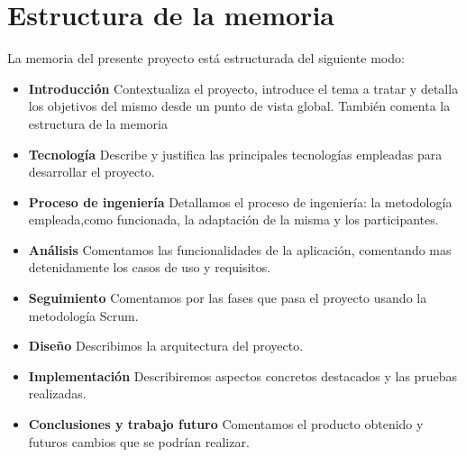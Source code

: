 \section{Estructura de la memoria}
La memoria del presente proyecto está estructurada del siguiente modo:

\begin{itemize}
\item \textbf{Introducción} Contextualiza el proyecto, introduce el tema a tratar y detalla los objetivos del mismo desde un punto de vista global.
 También comenta la estructura de la memoria 

\item \textbf{Tecnología} Describe y justifica las principales tecnologías empleadas para desarrollar el proyecto.



\item \textbf{Proceso de ingeniería} Detallamos el proceso de ingeniería: la metodología empleada,como funcionada, la adaptación de la misma y los participantes.


\item \textbf{Análisis} Comentamos las funcionalidades de la aplicación, comentando mas detenidamente los casos de uso y requisitos. 
\item \textbf{Seguimiento} Comentamos por las fases que pasa el proyecto usando la metodología Scrum.
\item \textbf{Diseño} Describimos la arquitectura del proyecto.
\item \textbf{Implementación} Describiremos aspectos concretos destacados y las pruebas realizadas.





\item \textbf{Conclusiones y trabajo futuro}
Comentamos el producto obtenido y futuros cambios que se podrían realizar.



\end{itemize}


